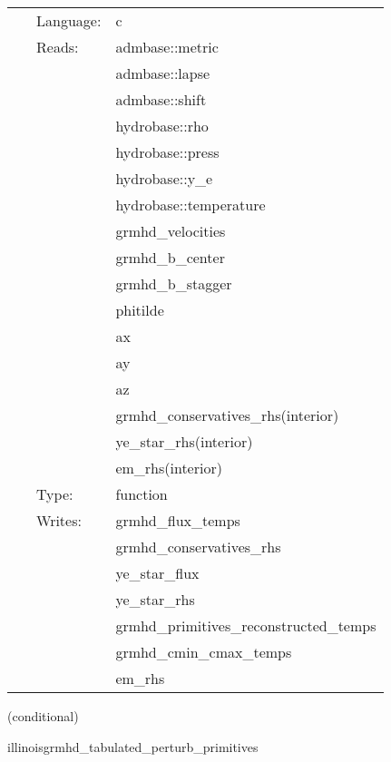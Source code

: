 \documentclass{article}
\begin{document}
\hspace{5mm}

 \begin{tabular*}{160mm}{cll} 
~ & Language:  & c \\ 
~ & Reads:  & admbase::metric \\ 
~& ~ &admbase::lapse\\ 
~& ~ &admbase::shift\\ 
~& ~ &hydrobase::rho\\ 
~& ~ &hydrobase::press\\ 
~& ~ &hydrobase::y\_e\\ 
~& ~ &hydrobase::temperature\\ 
~& ~ &grmhd\_velocities\\ 
~& ~ &grmhd\_b\_center\\ 
~& ~ &grmhd\_b\_stagger\\ 
~& ~ &phitilde\\ 
~& ~ &ax\\ 
~& ~ &ay\\ 
~& ~ &az\\ 
~& ~ &grmhd\_conservatives\_rhs(interior)\\ 
~& ~ &ye\_star\_rhs(interior)\\ 
~& ~ &em\_rhs(interior)\\ 
~ & Type:  & function \\ 
~ & Writes:  & grmhd\_flux\_temps \\ 
~& ~ &grmhd\_conservatives\_rhs\\ 
~& ~ &ye\_star\_flux\\ 
~& ~ &ye\_star\_rhs\\ 
~& ~ &grmhd\_primitives\_reconstructed\_temps\\ 
~& ~ &grmhd\_cmin\_cmax\_temps\\ 
~& ~ &em\_rhs\\ 
\end{tabular*} 


\vspace{5mm}

   (conditional) 

\hspace{5mm} illinoisgrmhd\_tabulated\_perturb\_primitives 

\hspace{5mm}{\it tabulated version of illinoisgrmhd\_perturb\_primitives } 


\hspace{5mm}
\end{document}
